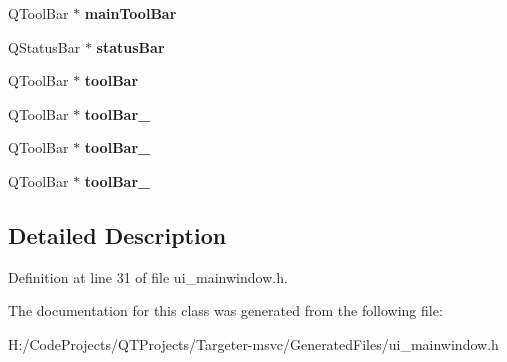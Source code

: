 \begin{DoxyCompactItemize}
Q\+Tool\+Bar $\ast$ {\bfseries main\+Tool\+Bar}
\item 
\mbox{\label{class_ui___main_window_a50fa481337604bcc8bf68de18ab16ecd}} 
Q\+Status\+Bar $\ast$ {\bfseries status\+Bar}
\item 
\mbox{\label{class_ui___main_window_ab84dc49349f514d7b7d3fe8e78de069b}} 
Q\+Tool\+Bar $\ast$ {\bfseries tool\+Bar}
\item 
\mbox{\label{class_ui___main_window_a5fc53408d466b2c64213d2edd23bb86e}} 
Q\+Tool\+Bar $\ast$ {\bfseries tool\+Bar\+\_}
\item 
\mbox{\label{class_ui___main_window_a8cc80c2319786627a7b3076d7a7d7217}} 
Q\+Tool\+Bar $\ast$ {\bfseries tool\+Bar\+\_}
\item 
\mbox{\label{class_ui___main_window_ad718ef13767e15dc5e9b3c2babeba3bc}} 
Q\+Tool\+Bar $\ast$ {\bfseries tool\+Bar\+\_}
\end{DoxyCompactItemize}


\subsection{Detailed Description}


Definition at line 31 of file ui\+\_\+mainwindow.\+h.



The documentation for this class was generated from the following file\+:\begin{DoxyCompactItemize}
\item 
H\+:/\+Code\+Projects/\+Q\+T\+Projects/\+Targeter-\/msvc/\+Generated\+Files/ui\+\_\+mainwindow.\+h\end{DoxyCompactItemize}
